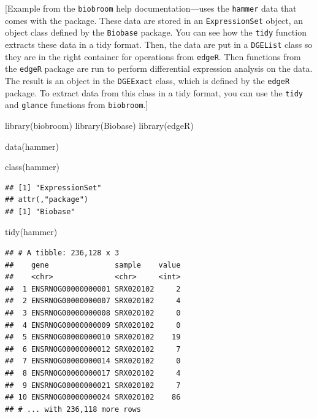 \documentclass[]{tufte-book}
\newenvironment{Shaded}{}{}
\newcommand{\FunctionTok}[1]{\textcolor[rgb]{0.02,0.16,0.49}{#1}}
\newcommand{\NormalTok}[1]{#1}
\begin{document}
{[}Example from the \texttt{biobroom} help documentation---uses the \texttt{hammer} data
that comes with the package. These data are stored in an \texttt{ExpressionSet}
object, an object class defined by the \texttt{Biobase} package. You can see how the \texttt{tidy} function extracts these data in a
tidy format. Then, the data are put in a \texttt{DGEList} class so they are in
the right container for operations from \texttt{edgeR}. Then functions from the
\texttt{edgeR} package are run to perform differential expression analysis on the
data. The result is an object in the \texttt{DGEExact} class, which is defined
by the \texttt{edgeR} package. To extract data from this class in a tidy format,
you can use the \texttt{tidy} and \texttt{glance} functions from \texttt{biobroom}.{]}

\begin{Shaded}
\begin{Highlighting}[]
\FunctionTok{library}\NormalTok{(biobroom)}
\FunctionTok{library}\NormalTok{(Biobase)}
\FunctionTok{library}\NormalTok{(edgeR)}

\FunctionTok{data}\NormalTok{(hammer)}

\FunctionTok{class}\NormalTok{(hammer)}
\end{Highlighting}
\end{Shaded}

\begin{verbatim}
## [1] "ExpressionSet"
## attr(,"package")
## [1] "Biobase"
\end{verbatim}

\begin{Shaded}
\begin{Highlighting}[]
\FunctionTok{tidy}\NormalTok{(hammer)}
\end{Highlighting}
\end{Shaded}

\begin{verbatim}
## # A tibble: 236,128 x 3
##    gene               sample    value
##    <chr>              <chr>     <int>
##  1 ENSRNOG00000000001 SRX020102     2
##  2 ENSRNOG00000000007 SRX020102     4
##  3 ENSRNOG00000000008 SRX020102     0
##  4 ENSRNOG00000000009 SRX020102     0
##  5 ENSRNOG00000000010 SRX020102    19
##  6 ENSRNOG00000000012 SRX020102     7
##  7 ENSRNOG00000000014 SRX020102     0
##  8 ENSRNOG00000000017 SRX020102     4
##  9 ENSRNOG00000000021 SRX020102     7
## 10 ENSRNOG00000000024 SRX020102    86
## # ... with 236,118 more rows
\end{verbatim}
\end{document}
